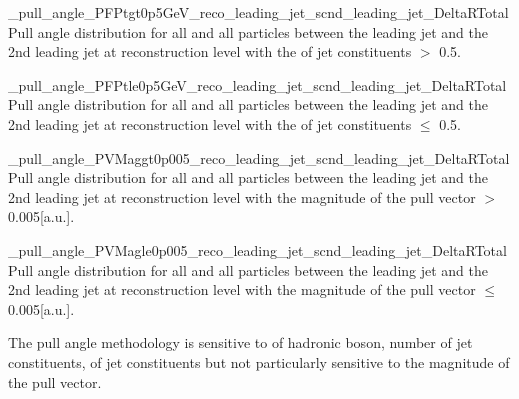           {_pull_angle_PFPtgt0p5GeV_reco_leading_jet_scnd_leading_jet_DeltaRTotal}
          {Pull angle distribution for all \DeltaR and all particles between the leading jet and the 2nd leading jet at reconstruction level with the \pt of jet constituents $>$ 0.5\GeV.}

          {_pull_angle_PFPtle0p5GeV_reco_leading_jet_scnd_leading_jet_DeltaRTotal}
          {Pull angle distribution for all \DeltaR and all particles between the leading jet and the 2nd leading jet at reconstruction level with the \pt of jet constituents $\leq$ 0.5\GeV.}

          {_pull_angle_PVMaggt0p005_reco_leading_jet_scnd_leading_jet_DeltaRTotal}
          {Pull angle distribution for all \DeltaR and all particles between the leading jet and the 2nd leading jet at reconstruction level with the magnitude of the pull vector $> $0.005[a.u.].}

          {_pull_angle_PVMagle0p005_reco_leading_jet_scnd_leading_jet_DeltaRTotal}
          {Pull angle distribution for all \DeltaR and all particles between the leading jet and the 2nd leading jet at reconstruction level with the magnitude of the pull vector $\leq $0.005[a.u.].}

The pull angle methodology is sensitive to \pt of hadronic \PW boson, number of jet constituents, \pt of jet constituents but not particularly sensitive to the magnitude of the pull vector.

